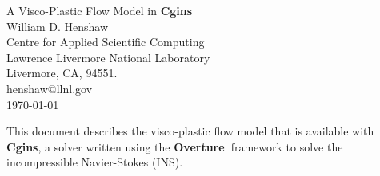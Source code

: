 \documentclass[11pt]{article}
\newcommand{\Overture}{{\bf Over\-ture\ }}
\begin{document}


\def\comma  {~~~,~~}
\newcommand{\uvd}{\mathbf{U}}
\def\ud     {{    U}}
\def\pd     {{    P}}
\def\calo{{\cal O}}

\newcommand{\mbar}{\bar{m}}
\newcommand{\Rbar}{\bar{R}}
\newcommand{\Ru}{R_u}         %
\newcommand{\Div}{\grad\cdot}
\newcommand{\tauv}{\boldsymbol{\tau}}
\newcommand{\thetav}{\boldsymbol{\theta}}

\newcommand{\Omegav}{\boldsymbol{\Omega}}
\newcommand{\omegav}{\boldsymbol{\omega}}
\newcommand{\sigmav}{\boldsymbol{\sigma}}
\newcommand{\cm}{{\rm cm}}
\newcommand{\Jc}{{\mathcal J}}

\newcommand{\sumi}{\sum_{i=1}^n}
\newcommand{\dt}{{\Delta t}}

\def\ff {\tt} %



\newcommand{\figWidth}{}
\newcommand{\clipfig}{}

\newcommand{\bogus}[1]{}  %

\vspace{5\baselineskip}
\begin{flushleft}
{\Large
A Visco-Plastic Flow Model in {\bf Cgins} \\
}
\vspace{2\baselineskip}
William D. Henshaw  \\
Centre for Applied Scientific Computing  \\
Lawrence Livermore National Laboratory      \\
Livermore, CA, 94551.  \\
henshaw@llnl.gov \\
\vspace{\baselineskip}
\today\\
\vspace{\baselineskip}

\vspace{4\baselineskip}


This document describes the visco-plastic flow model that is available with 
{\bf Cgins}, a solver written using the \Overture framework
to solve the incompressible Navier-Stokes (INS).  

\end{flushleft}
\end{document}
